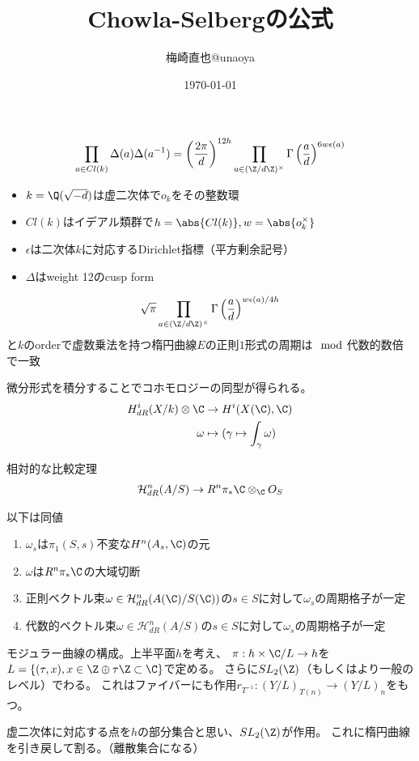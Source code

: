 \documentclass[uplatex]{jsarticle}
\title{Chowla-Selbergの公式}
\author{梅崎直也@unaoya}
\date{\today}
\begin{document}
\maketitle
\begin{thm}
\begin{align*}
\prod_{a\in Cl(k)}\Delta(a)\Delta(a^{-1})=\left(\frac{2\pi}{d}\right)^{12h}\prod_{a\in(\Z/d\Z)^\times}\Gamma\left(\frac{a}{d}\right)^{6w\epsilon(a)}
\end{align*}
\end{thm}

\begin{itemize}
\item $k=\Q(\sqrt{-d})$は虚二次体で$o_k$をその整数環
\item $Cl(k)$はイデアル類群で$h=\abs{Cl(k)}, w=\abs{o_k^\times}$
\item $\epsilon$は二次体$k$に対応するDirichlet指標（平方剰余記号）
\item $\Delta$はweight 12のcusp form
\end{itemize}

\begin{thm}[Gross]
\begin{align*}
\sqrt{\pi}\prod_{a\in(\Z/d\Z)^\times}\Gamma\left(\frac{a}{d}\right)^{w\epsilon(a)/4h}
\end{align*}
と$k$のorderで虚数乗法を持つ楕円曲線$E$の正則$1$形式の周期は$\mod $代数的数倍で一致
\end{thm}

\begin{thm}
微分形式を積分することでコホモロジーの同型が得られる。
\begin{align*}
H^i_{dR}(X/k) \otimes \C &\to H^i(X(\C), \C)\\
\omega &\mapsto (\gamma\mapsto\int_\gamma\omega)
\end{align*}

相対的な比較定理
\begin{align*}
\mathcal{H}^n_{dR}(A/S) \to R^n\pi_*\C \otimes_{\C}O_S
\end{align*}
\end{thm}

\begin{thm}
以下は同値
\begin{enumerate}
\item $\omega_s$は$\pi_1(S,s)$不変な$H^n(A_s,\C)$の元
\item $\omega$は$R^n\pi_*\C$の大域切断
\item 正則ベクトル束$\omega\in\mathcal{H}^n_{dR}(A(\C)/S(\C))$の$s\in S$に対して$\omega_s$の周期格子が一定
\item 代数的ベクトル束$\omega\in\mathcal{H}^n_{dR}(A/S)$の$s\in S$に対して$\omega_s$の周期格子が一定
\end{enumerate}
\end{thm}

モジュラー曲線の構成。上半平面$h$を考え、
$\pi:h\times \C/L \to h$を$L=\{(\tau, x), x \in \Z \oplus \tau\Z \subset \C\}$で定める。
さらに$SL_2(\Z)$（もしくはより一般のレベル）でわる。
これはファイバーにも作用$r_{T^{-1}}:(Y/L)_{T(n)} \to (Y/L)_n$をもつ。

虚二次体に対応する点を$h$の部分集合と思い、$SL_2(\Z)$が作用。
これに楕円曲線を引き戻して割る。（離散集合になる）
\end{document}
